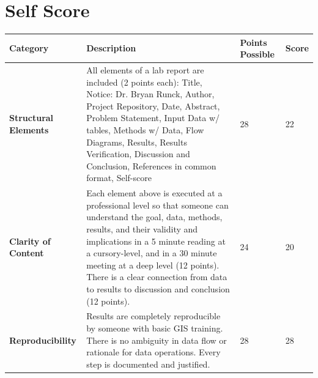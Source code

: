 \documentclass[article,12pt]{article}
\numberwithin{equation}{section}
\begin{document}
\section*{Self Score}
\begin{tabular}{|p{.2\linewidth}|p{.2\linewidth}|p{.2\linewidth}|p{.1\linewidth}|}
	\hline
	\textbf{Category}            & \textbf{Description}                                                                                                                                                                                                                                                                                                                                              & \textbf{Points Possible} & \textbf{Score} \\ \hline
\vspace{.2in}\textbf{Structural Elements} & {\tiny All elements of a lab report are included (2 points each): Title, Notice: Dr. Bryan Runck, Author, Project Repository, Date, Abstract, Problem Statement, Input Data w/ tables, Methods w/ Data, Flow Diagrams, Results, Results Verification, Discussion and Conclusion, References in common format, Self-score}                                        & \vspace{.2in}28              &   \vspace{.2in}22    \\ \hline
	\vspace{.2in}\textbf{Clarity of Content}  & {\tiny Each element above is executed at a professional level so that someone can understand the goal, data, methods, results, and their validity and implications in a 5 minute reading at a cursory-level, and in a 30 minute meeting at a deep level (12 points). There is a clear connection from data to results to discussion and conclusion (12 points).} & \vspace{.2in}24              &  \vspace{.2in}20     \\ \hline
	\vspace{.2in}\textbf{Reproducibility}     & {\tiny Results are completely reproducible by someone with basic GIS training. There is no ambiguity in data flow or rationale for data operations. Every step is documented and justified.}                                                                                                                                                                     & \vspace{.2in}28              &     \vspace{.2in}28  \\ \hline

\end{tabular}
\end{document}
